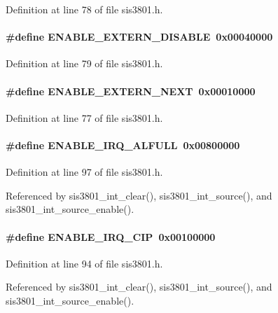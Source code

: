 Definition at line 78 of file sis3801.h.
\paragraph[{ENABLE\_\-EXTERN\_\-DISABLE}]{\setlength{\rightskip}{0pt plus 5cm}\#define ENABLE\_\-EXTERN\_\-DISABLE~0x00040000}\hfill\label{sis3801_8h_a6cafc0fcd1a38c0b9a2fa0395ea3e855}


Definition at line 79 of file sis3801.h.
\paragraph[{ENABLE\_\-EXTERN\_\-NEXT}]{\setlength{\rightskip}{0pt plus 5cm}\#define ENABLE\_\-EXTERN\_\-NEXT~0x00010000}\hfill\label{sis3801_8h_a9f2db005f8a5bd48db06ccea3a41f720}


Definition at line 77 of file sis3801.h.
\paragraph[{ENABLE\_\-IRQ\_\-ALFULL}]{\setlength{\rightskip}{0pt plus 5cm}\#define ENABLE\_\-IRQ\_\-ALFULL~0x00800000}\hfill\label{sis3801_8h_a900b2b69c1af4d0aa4583571453e5106}


Definition at line 97 of file sis3801.h.

Referenced by sis3801\_\-int\_\-clear(), sis3801\_\-int\_\-source(), and sis3801\_\-int\_\-source\_\-enable().
\paragraph[{ENABLE\_\-IRQ\_\-CIP}]{\setlength{\rightskip}{0pt plus 5cm}\#define ENABLE\_\-IRQ\_\-CIP~0x00100000}\hfill\label{sis3801_8h_a421e0644fc250f378dacbd165d911106}


Definition at line 94 of file sis3801.h.

Referenced by sis3801\_\-int\_\-clear(), sis3801\_\-int\_\-source(), and sis3801\_\-int\_\-source\_\-enable().
